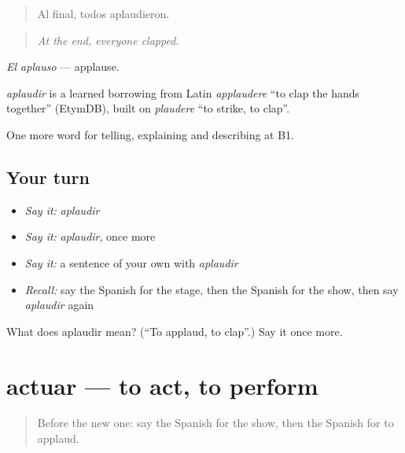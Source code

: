 \begin{quote}
Al final, todos aplaudieron.
\end{quote}

\begin{quote}
\emph{At the end, everyone clapped.}
\end{quote}

\emph{El aplauso} — applause.

\begin{cousinweb}
\emph{aplaudir} is a learned borrowing from Latin \emph{applaudere} \textquotedblleft{}to clap the hands together\textquotedblright{} (EtymDB), built on \emph{plaudere} \textquotedblleft{}to strike, to clap\textquotedblright{}.
\end{cousinweb}

\begin{grammarlens}[title={What you've built}]
One more word for telling, explaining and describing at B1.
\end{grammarlens}

\subsection*{Your turn}
\begin{itemize}
\raggedright
  \item \emph{Say it:} \emph{aplaudir}
  \item \emph{Say it:} \emph{aplaudir}, once more
  \item \emph{Say it:} a sentence of your own with \emph{aplaudir}
  \item \emph{Recall:} say the Spanish for the stage, then the Spanish for the show, then say \emph{aplaudir} again
\end{itemize}

\begin{tcolorbox}[breakable,colback=teal!4,colframe=teal!35!black,title={Before you move on}]
What does aplaudir mean? (\textquotedblleft{}To applaud, to clap\textquotedblright{}.) Say it once more.
\end{tcolorbox}
\section[actuar]{actuar — to act, to perform}

\label{lesson:ES-C759-actuar}



\begin{quote}
Before the new one: say the Spanish for the show, then the Spanish for to applaud.
\end{quote}

